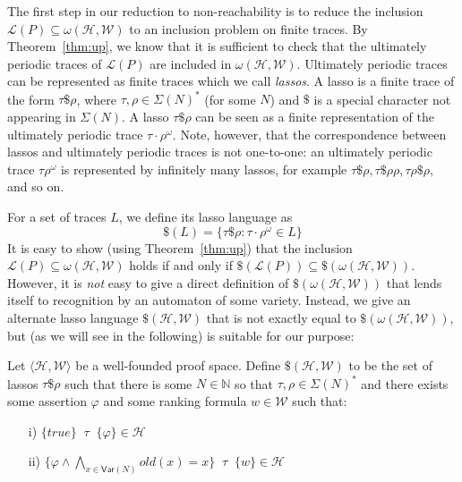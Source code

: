 \documentclass[9pt,nocopyrightspace]{sigplanconf}
\theoremstyle{definition}
\newcommand{\tuple}[1]{\langle #1 \rangle}
\newcommand{\true}{\textit{true}}
\newcommand{\hoare}[3]{\{{#1}\}\;\;#2\;\;\{{#3}\}}
\newcommand{\rankformula}{w}
\newcommand{\rankformulas}{\mathscr{W}}
\newcommand{\lang}{\mathcal{L}}
\renewcommand{\phi}{\varphi}
\newcommand{\old}[1]{\textit{old}(#1)}
\newcommand{\ftrace}{finite trace}
\newcommand{\iSigma}[1]{\Sigma(#1)}
\newcommand{\iVar}[1]{\textsf{Var}(#1)}
\begin{document}
The first step in our reduction to non-reachability is to reduce the inclusion
$\lang(P) \subseteq \omega(\mathscr{H},\rankformulas)$ to an inclusion
problem on \ftrace{}s.  By Theorem~\ref{thm:up}, we know that it is sufficient
to check that the ultimately periodic traces of $\lang(P)$ are included in
 $\omega(\mathscr{H},\rankformulas)$.  Ultimately
periodic traces can be represented as finite traces which we call
\emph{lassos}.  A lasso is a finite trace of the form $\tau\$ \rho$, where
$\tau,\rho \in \iSigma{N}^*$ (for some $N$) and $\$$ is a special character not appearing in
$\iSigma{N}$.  A lasso $\tau\$\rho$ can be seen as a finite representation of
the ultimately periodic trace $\tau \cdot\rho^\omega$.  Note, however, that the
correspondence between lassos and ultimately periodic traces is not
one-to-one: an ultimately periodic trace $\tau\rho^\omega$ is represented by
infinitely many lassos, for example $\tau\$\rho, \tau\$\rho\rho,
\tau\rho\$\rho,$ and so on.

For a set of traces $L$, we define its lasso language as \[\$(L) = \{ \tau\$\rho
: \tau\cdot \rho^\omega \in L \} \] It is easy to show (using
Theorem~\ref{thm:up}) that the inclusion $\lang(P) \subseteq
\omega(\mathscr{H},\rankformulas)$ holds if and only if $\$(\lang(P)) \subseteq
\$(\omega(\mathscr{H},\rankformulas))$.  However, it is \emph{not} easy to give a direct
definition of $\$(\omega(\mathscr{H},\rankformulas))$ that lends
itself to recognition by an automaton of some variety.    Instead, we give an alternate lasso language $\$(\mathscr{H},\rankformulas)$
that is not exactly equal to $\$(\omega(\mathscr{H},\rankformulas))$, but (as we will see
in the following) is suitable for our purpose:

\begin{definition} \label{def:lasso-lang}
  Let $\tuple{\mathscr{H},\rankformulas}$ be a well-founded proof space.  Define
  $\$(\mathscr{H},\rankformulas)$ to be the set of lassos $\tau \$ \rho$ such that there
  is some $N \in \mathbb{N}$ so that $\tau,\rho \in \Sigma(N)^*$ and there
  exists some assertion $\phi$ and some ranking formula $\rankformula \in \rankformulas$ such that:
  \begin{enumerate}
  \item[i)] $\hoare{\true}{\tau}{\phi} \in \mathscr{H}$
  \item[ii)] $\hoare{\phi \land \bigwedge_{x \in \iVar{N}} \old{x} = x}{\tau}{\rankformula}
    \in \mathscr{H}$ \qedhere
  \end{enumerate}
\end{definition}
\end{document}
